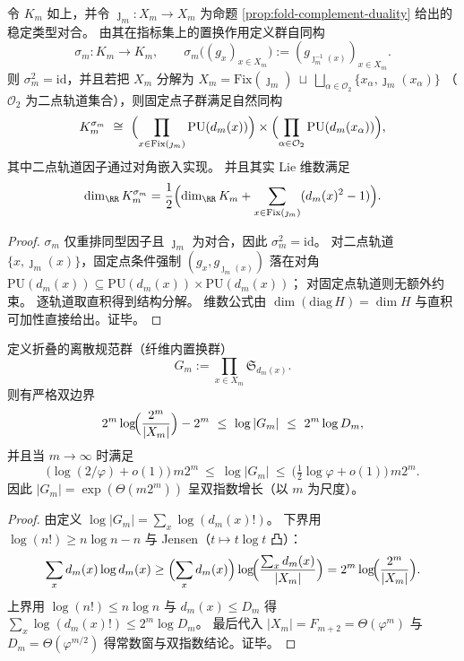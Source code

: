 

\begin{proposition}\label{prop:fold-groupoid-aut0-complement-fixed-subgroup}
令 \(K_m\) 如上，并令 \(\jmath_m:X_m\to X_m\) 为命题 \ref{prop:fold-complement-duality} 给出的稳定类型对合。
由其在指标集上的置换作用定义群自同构
\[
\sigma_m:K_m\to K_m,\qquad
\sigma_m\bigl((g_x)_{x\in X_m}\bigr):=(g_{\jmath_m^{-1}(x)})_{x\in X_m}.
\]
则 \(\sigma_m^2=\mathrm{id}\)，并且若把 \(X_m\) 分解为
\(
X_m=\mathrm{Fix}(\jmath_m)\ \sqcup\ \bigsqcup_{\alpha\in\mathcal O_2}\{x_\alpha,\jmath_m(x_\alpha)\}
\)
（\(\mathcal O_2\) 为二点轨道集合），则固定点子群满足自然同构
\[
K_m^{\sigma_m}\ \cong\
\Bigl(\prod_{x\in \mathrm{Fix}(\jmath_m)}\mathrm{PU}(d_m(x))\Bigr)\times
\Bigl(\prod_{\alpha\in\mathcal O_2}\mathrm{PU}(d_m(x_\alpha))\Bigr),
\]
其中二点轨道因子通过对角嵌入实现。
并且其实 Lie 维数满足
\[
\dim_{\RR}K_m^{\sigma_m}
=\frac12\Bigl(\dim_{\RR}K_m+\sum_{x\in \mathrm{Fix}(\jmath_m)}(d_m(x)^2-1)\Bigr).
\]
\end{proposition}
\begin{proof}
\(\sigma_m\) 仅重排同型因子且 \(\jmath_m\) 为对合，因此 \(\sigma_m^2=\mathrm{id}\)。
对二点轨道 \(\{x,\jmath_m(x)\}\)，固定点条件强制 \((g_x,g_{\jmath_m(x)})\) 落在对角 \(\mathrm{PU}(d_m(x))\subseteq \mathrm{PU}(d_m(x))\times \mathrm{PU}(d_m(x))\)；
对固定点轨道则无额外约束。
逐轨道取直积得到结构分解。
维数公式由 \(\dim(\mathrm{diag}\,H)=\dim H\) 与直积可加性直接给出。证毕。
\end{proof}

\begin{theorem}[离散规范群的双指数律]\label{thm:fold-discrete-gauge-group-double-exponential}
定义折叠的离散规范群（纤维内置换群）
\[
G_m:=\prod_{x\in X_m}\mathfrak S_{d_m(x)}.
\]
则有严格双边界
\[
2^m\log\!\Bigl(\frac{2^m}{|X_m|}\Bigr)-2^m
\ \le\
\log|G_m|
\ \le\
2^m\log D_m,
\]
并且当 \(m\to\infty\) 时满足
\[
\bigl(\log(2/\varphi)+o(1)\bigr)\,m2^m
\ \le\
\log|G_m|
\ \le\
\bigl(\tfrac12\log\varphi+o(1)\bigr)\,m2^m.
\]
因此
\(
|G_m|=\exp(\Theta(m2^m))
\)
呈双指数增长（以 \(m\) 为尺度）。
\end{theorem}
\begin{proof}
由定义 \(\log|G_m|=\sum_x \log(d_m(x)!)\)。
下界用 \(\log(n!)\ge n\log n-n\) 与 Jensen（\(t\mapsto t\log t\) 凸）：
\[
\sum_x d_m(x)\log d_m(x)
\ge
\Bigl(\sum_x d_m(x)\Bigr)\log\!\Bigl(\frac{\sum_x d_m(x)}{|X_m|}\Bigr)
=2^m\log\!\Bigl(\frac{2^m}{|X_m|}\Bigr).
\]
上界用 \(\log(n!)\le n\log n\) 与 \(d_m(x)\le D_m\) 得 \(\sum_x \log(d_m(x)!)\le 2^m\log D_m\)。
最后代入 \(|X_m|=F_{m+2}=\Theta(\varphi^m)\) 与 \(D_m=\Theta(\varphi^{m/2})\) 得常数窗与双指数结论。证毕。
\end{proof}

